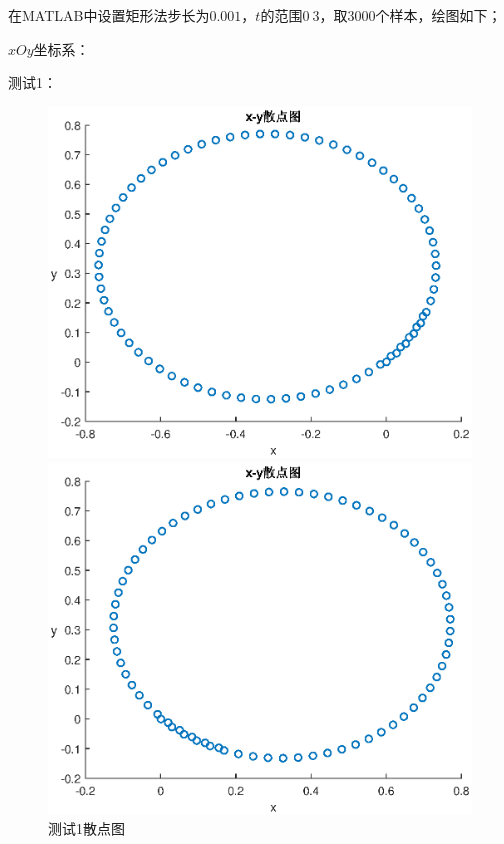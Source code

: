 \documentclass[withoutpreface,bwprint]{cumcmthesis}
\begin{document}
在MATLAB中设置矩形法步长为$0.001$，$t$的范围0$~$3，取3000个样本，绘图如下；

$xOy$坐标系：

测试1：
\begin{figure}[!h]  
\centering  
\begin{minipage}{.5\textwidth}  
  \centering  
  \includegraphics[width=.9\linewidth]{k1+45.eps}  
\end{minipage}%
\begin{minipage}{.5\textwidth}  
  \centering  
  \includegraphics[width=.9\linewidth]{k1_san.eps}  
\end{minipage}  
\caption{测试1散点图}  
\end{figure} 
\end{document}

